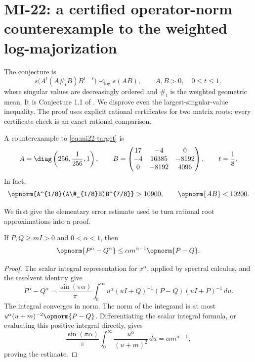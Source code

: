 \section{MI-22: a certified operator-norm counterexample to the weighted log-majorization}
\label{sec:mi22}
The conjecture is
\begin{equation}\label{eq:mi22-target}
 s\bigl(A^t(A\#_t B)B^{1-t}\bigr)\prec_{\log}s(AB),
 \qquad A,B>0,\quad 0\leq t\leq1,
\end{equation}
where singular values are decreasingly ordered and $\#_t$ is the weighted geometric mean. It is Conjecture 1.1 of \cite{GAMA2021}. We disprove even the largest-singular-value inequality. The proof uses explicit rational certificates for two matrix roots; every certificate check is an exact rational comparison.

\begin{theorem}\label{thm:mi22}
A counterexample to \eqref{eq:mi22-target} is
\[
 A=\diag\left(256,\frac1{256},1\right),\qquad
 B=\begin{pmatrix}17&-4&0\\-4&16385&-8192\\0&-8192&4096\end{pmatrix},
 \qquad t=\frac18.
\]
In fact,
\[
 \opnorm{A^{1/8}(A\#_{1/8}B)B^{7/8}}>10900,
 \qquad \opnorm{AB}<10200.
\]
\end{theorem}

We first give the elementary error estimate used to turn rational root approximations into a proof.
\begin{lemma}\label{lem:root-lipschitz}
If $P,Q\geq mI>0$ and $0<\alpha<1$, then
\[
 \opnorm{P^\alpha-Q^\alpha}
 \leq \alpha m^{\alpha-1}\opnorm{P-Q}.
\]
\end{lemma}
\begin{proof}
The scalar integral representation for $x^\alpha$, applied by spectral calculus, and the resolvent identity give
\[
 P^\alpha-Q^\alpha
 =\frac{\sin(\pi\alpha)}{\pi}\int_0^\infty
 u^\alpha(uI+Q)^{-1}(P-Q)(uI+P)^{-1}\,du.
\]
The integral converges in norm. The norm of the integrand is at most
$u^\alpha(u+m)^{-2}\opnorm{P-Q}$. Differentiating the scalar integral formula, or evaluating this positive integral directly, gives
\[
 \frac{\sin(\pi\alpha)}{\pi}\int_0^\infty\frac{u^\alpha}{(u+m)^2}\,du
 =\alpha m^{\alpha-1},
\]
proving the estimate.
\end{proof}

